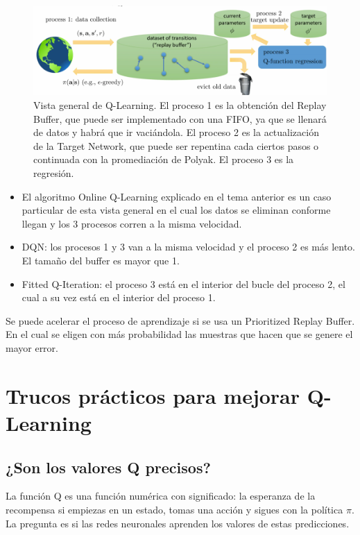 \begin{figure}[htpb]
	\centering
	\includegraphics[width=0.8\linewidth]{figures/2020-06-16-174411_1002x306_scrot.png}
	\caption{Vista general de Q-Learning. El proceso 1 es la obtención del Replay Buffer, que
    puede ser implementado con una FIFO, ya que se llenará de datos y habrá que ir vaciándola. El
proceso 2 es la actualización de la Target Network, que puede ser repentina cada ciertos pasos o
continuada con la promediación de Polyak. El proceso 3 es la regresión. }
\label{fig:qlearn}
\end{figure}

\begin{itemize}
    \item 
        El algoritmo Online Q-Learning explicado en el tema anterior es un caso particular de
        esta vista general en el cual los datos se eliminan conforme llegan y los 3 procesos corren a la
        misma velocidad.
    \item DQN: los procesos 1 y 3 van a la misma velocidad y el proceso 2 es más lento. El tamaño
        del buffer es mayor que 1.
    \item Fitted Q-Iteration: el proceso 3 está en el interior del bucle del proceso 2, el cual a
        su vez está en el interior del proceso 1.
\end{itemize}

Se puede acelerar el proceso de aprendizaje si se usa un Prioritized Replay Buffer. En el cual
se eligen con más probabilidad las muestras que hacen que se genere el mayor error. 

\section{Trucos prácticos para mejorar Q-Learning}%
\label{sec:trucos_prácticos_para_mejorar_q_learning}

\subsection{¿Son los valores Q precisos?}%
\label{sub:_son_los_valores_q_precisos_}

La función Q es una función numérica con significado: la esperanza de la recompensa si
empiezas en un estado, tomas una acción y sigues con la política $\pi$. La pregunta es si las
redes neuronales aprenden los valores de estas predicciones.

